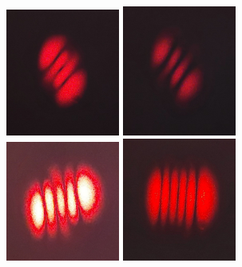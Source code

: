 \begin{figure}[H]
	\includegraphics[width=0.33333\textwidth, height = 0.33333\textwidth]{../Изображения/30.jpg}
	\includegraphics[width=0.33333\textwidth, height = 0.33333\textwidth]{../Изображения/30_2.jpg}
	\includegraphics[width=0.33333\textwidth, height = 0.33333\textwidth]{../Изображения/40.jpg}
	\includegraphics[width=0.33333\textwidth, height = 0.33333\textwidth]{../Изображения/50.jpg}
\end{figure}



